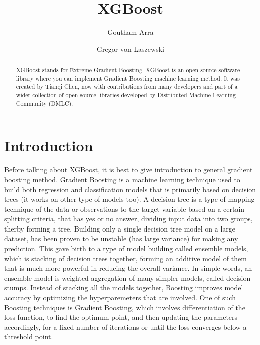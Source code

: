 
\title{XGBoost}


\author{Goutham Arra}

\author{Gregor von Laszewski}




\begin{abstract}  

XGBoost stands for Extreme Gradient Boosting. XGBoost is an open source 
software library where you can  implement Gradient Boosting machine learning 
method. It was created by Tianqi Chen, now with contributions from many 
developers and part of a wider collection of open source libraries developed by
Distributed Machine Learning Community (DMLC).

\end{abstract}



\maketitle


\section{Introduction}  

Before talking about XGBoost, it is best to give introduction to general
gradient boosting method. Gradient Boosting is a machine learning technique
used to build both regression and classification models that is primarily
based on decision trees (it works on other type of models too). A decision
tree is a type of mapping technique of the data or observations to the target
variable based on a certain splitting criteria, that has yes or no answer,
dividing input data into two groups, therby forming a tree.  Building only a
single decision tree model on a large dataset, has been proven to be  unstable
(has large variance) for making any prediction. This gave birth to a type of
model building called ensemble models, which is stacking of decision trees
together, forming an additive model of them that is much more powerful in
reducing the overall variance. In simple words, an ensemble model is weighted
aggregation of many simpler models, called decision stumps. Instead of
stacking all the models together, Boosting improves model accuracy by
optimizing  the hyperparemeters that are involved. One of such Boosting
techniques is Gradient Boosting, which involves differentiation of the loss
function, to find the optimum point, and then updating the  parameters
accordingly, for a fixed number of iterations or until the loss converges
below a threshold point.

